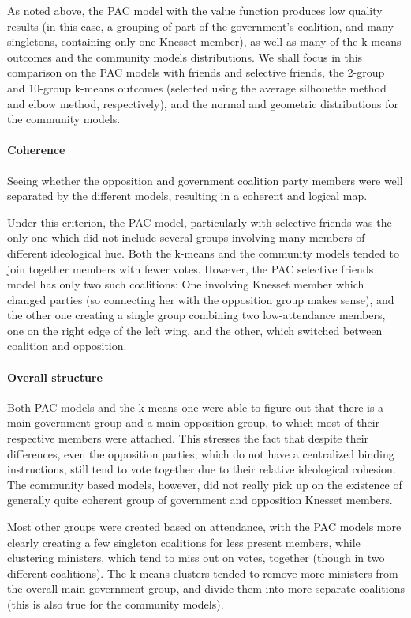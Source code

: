 \documentclass[letterpaper]{article} %
\theoremstyle{definition}
\begin{document}
As noted above, the PAC model with the value function produces low quality results (in this case, a grouping of part of the government's coalition, and many singletons, containing only one Knesset member), as well as many of the k-means outcomes and the community models distributions. We shall focus in this comparison on the PAC models with friends and selective friends, the 2-group and 10-group k-means outcomes (selected using the average silhouette method and elbow method, respectively), and the normal and geometric distributions for the community models.

\paragraph{Coherence}
Seeing whether the opposition and government coalition party members were well separated by the different models, resulting in a coherent and logical map.

Under this criterion, the PAC model, particularly with selective friends was the only one which did not include several groups involving many members of different ideological hue. Both the k-means and the community models tended to join together members with fewer votes. However, the PAC selective friends model has only two such coalitions: One involving Knesset member which changed parties (so connecting her with the opposition group makes sense), and the other one creating a single group combining two low-attendance members, one on the right edge of the left wing, and the other, which switched between coalition and opposition.

\paragraph{Overall structure}
Both PAC models and the k-means one were able to figure out that there is a main government group and a main opposition group, to which most of their respective members were attached. This stresses the fact that despite their differences, even the opposition parties, which do not have a centralized binding instructions, still tend to vote together due to their relative ideological cohesion. The community based models, however, did not really pick up on the existence of generally quite coherent group of government and opposition Knesset members.

Most other groups were created based on attendance, with the PAC models more clearly creating a few singleton coalitions for less present members, while clustering ministers, which tend to miss out on votes, together (though in two different coalitions). The k-means clusters tended to remove more ministers from the overall main government group, and divide them into more separate coalitions (this is also true for the community models).
\end{document}

